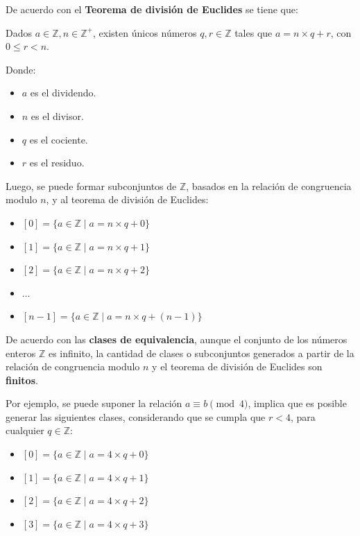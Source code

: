 \documentclass{article}
\begin{document}
De acuerdo con el \textbf{Teorema de división de Euclides} se tiene que:

Dados $a \in \mathbb{Z}, n \in \mathbb{Z}^+$, existen únicos números $q, r \in \mathbb{Z}$ tales que $a = n \times q + r$, con $0 \le r < n$.

Donde:

\begin{itemize}
    \item $a$ es el dividendo.
    \item $n$ es el divisor.
    \item $q$ es el cociente.
    \item $r$ es el residuo.
\end{itemize}

Luego, se puede formar subconjuntos de $\mathbb{Z}$, basados en la relación de congruencia modulo $n$, y al teorema de división de Euclides:

\begin{itemize}
    \item $\left[0\right] = \{a \in \mathbb{Z} \mid a = n \times q + 0\}$
    \item $\left[1\right] = \{a \in \mathbb{Z} \mid a = n \times q + 1\}$
    \item $\left[2\right] = \{a \in \mathbb{Z} \mid a = n \times q + 2\}$
    \item $\dots$
    \item $\left[n - 1\right] = \{a \in \mathbb{Z} \mid a = n \times q + (n - 1)\}$
\end{itemize}

De acuerdo con las \textbf{clases de equivalencia}, aunque el conjunto de los números enteros $\mathbb{Z}$ es infinito, la cantidad de clases o subconjuntos generados a partir de la relación de congruencia modulo $n$ y el teorema de división de Euclides son \textbf{finitos}. 

Por ejemplo, se puede suponer la relación $a \equiv b \pmod 4$, implica que es posible generar las siguientes clases, considerando que se cumpla que $r < 4$, para cualquier $q \in \mathbb{Z}$:

\begin{itemize}
    \item $\left[0\right] = \{a \in \mathbb{Z} \mid a = 4 \times q + 0\}$
    \item $\left[1\right] = \{a \in \mathbb{Z} \mid a = 4 \times q + 1\}$
    \item $\left[2\right] = \{a \in \mathbb{Z} \mid a = 4 \times q + 2\}$
    \item $\left[3\right] = \{a \in \mathbb{Z} \mid a = 4 \times q + 3\}$
\end{itemize}
\end{document}
